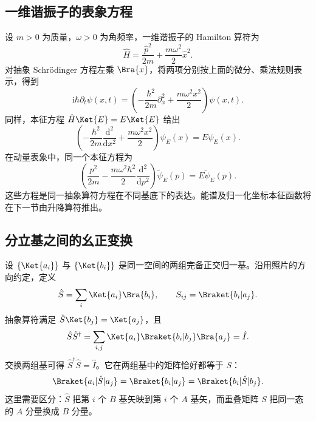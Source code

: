 \subsection{一维谐振子的表象方程}
设 $m>0$ 为质量，$\omega>0$ 为角频率，一维谐振子的 Hamilton 算符为
\begin{equation}
\hat H=\frac{\hat p^2}{2m}+\frac{m\omega^2}{2}\hat x^2.
\label{eq:ho-hamiltonian}
\end{equation}
对抽象 Schrödinger 方程左乘 $\Bra{x}$，将两项分别按上面的微分、乘法规则表示，得到
\begin{equation}
\mathrm{i}\hbar\partial_t\psi\left(x,t\right)
=\left(-\frac{\hbar^2}{2m}\partial_x^2+\frac{m\omega^2x^2}{2}\right)\psi\left(x,t\right).
\end{equation}
同样，本征方程 $\hat H\Ket{E}=E\Ket{E}$ 给出
\begin{equation}
\left(-\frac{\hbar^2}{2m}\frac{\mathrm{d}^2}{\mathrm{d}x^2}
+\frac{m\omega^2x^2}{2}\right)\psi_E\left(x\right)=E\psi_E\left(x\right).
\end{equation}
在动量表象中，同一个本征方程为
\begin{equation}
\left(\frac{p^2}{2m}-\frac{m\omega^2\hbar^2}{2}
\frac{\mathrm{d}^2}{\mathrm{d}p^2}\right)\widetilde\psi_E\left(p\right)
=E\widetilde\psi_E\left(p\right).
\end{equation}
这些方程是同一抽象算符方程在不同基底下的表达。能谱及归一化坐标本征函数将在下一节由升降算符推出。

\subsection{分立基之间的幺正变换}
设 $\left\{\Ket{a_i}\right\}$ 与 $\left\{\Ket{b_i}\right\}$ 是同一空间的两组完备正交归一基。沿用照片的方向约定，定义
\begin{equation}
\hat S=\sum_i\Ket{a_i}\Bra{b_i},\qquad
S_{ij}=\Braket{b_i|a_j}.
\label{eq:S-definition}
\end{equation}
抽象算符满足 $\hat S\Ket{b_j}=\Ket{a_j}$，且
\begin{equation}
\hat S\hat S^\dagger
=\sum_{i,j}\Ket{a_i}\Braket{b_i|b_j}\Bra{a_j}=\hat I.
\end{equation}
交换两组基可得 $\hat S^\dagger\hat S=\hat I$。它在两组基中的矩阵恰好都等于 $S$：
\begin{equation}
\Braket{a_i|\hat S|a_j}=\Braket{b_i|a_j}
=\Braket{b_i|\hat S|b_j}.
\end{equation}
这里需要区分：$\hat S$ 把第 $i$ 个 $B$ 基矢映到第 $i$ 个 $A$ 基矢，而重叠矩阵 $S$ 把同一态的 $A$ 分量换成 $B$ 分量。

